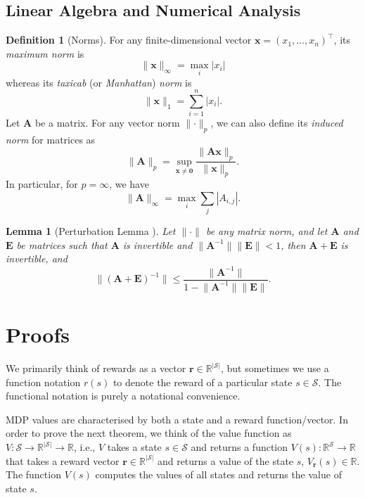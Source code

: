 \documentclass{article}
\newtheorem{lemma}[theorem]{Lemma}
\theoremstyle{definition}
\newtheorem{definition}[theorem]{Definition}
\theoremstyle{remark}
\newcommand{\V}{V_{\mathbf{r}}}
\begin{document}
\subsection{Linear Algebra and Numerical Analysis}

\begin{definition}[Norms]
  For any finite-dimensional vector $\mathbf{x} = (x_1, \dots, x_n)^\intercal$,
  its \emph{maximum norm} is
  \[
    \lVert \mathbf{x} \rVert_\infty = \max_i |x_i|
  \]
  whereas its \emph{taxicab} (or \emph{Manhattan}) \emph{norm} is
  \[
    \lVert \mathbf{x} \rVert_1 = \sum_{i = 1}^n |x_i|.
  \]
  Let $\mathbf{A}$ be a matrix. For any vector norm $\lVert
  \cdot \rVert_p$, we can also define its \emph{induced norm} for matrices as
  \[
    \lVert \mathbf{A} \rVert_p = \sup_{\mathbf{x} \ne \mathbf{0}} \frac{\lVert
      \mathbf{Ax} \rVert_p}{\lVert \mathbf{x} \rVert_p}.
  \]
  In particular, for $p = \infty$, we have
  \[
    \lVert \mathbf{A} \rVert_\infty = \max_i \sum_{j} |A_{i,j}|.
  \]
\end{definition}

\begin{lemma}[Perturbation Lemma
  \cite{layton2014numerical}] \label{prop:condition_number}
  Let $\lVert \cdot \rVert$ be any matrix norm, and let $\mathbf{A}$ and
  $\mathbf{E}$ be matrices such that $\mathbf{A}$ is invertible and $\lVert
  \mathbf{A}^{-1} \rVert \lVert \mathbf{E} \rVert < 1$, then $\mathbf{A} +
  \mathbf{E}$ is invertible, and
  \[
    \lVert (\mathbf{A} + \mathbf{E})^{-1} \rVert \le \frac{\lVert
      \mathbf{A}^{-1} \rVert}{1 - \lVert \mathbf{A}^{-1} \rVert \lVert
      \mathbf{E} \rVert}.
  \]
\end{lemma}

\section{Proofs}

We primarily think of rewards as a vector $\mathbf{r} \in
\mathbb{R}^{|\mathcal{S}|}$, but sometimes we use a function notation $r(s)$ to
denote the reward of a particular state $s \in \mathcal{S}$. The functional
notation is purely a notational convenience.

MDP values are characterised by both a state and a reward function/vector. In
order to prove the next theorem, we think of the value function as $V :
\mathcal{S} \to \mathbb{R}^{|\mathcal{S}|} \to \mathbb{R}$, i.e., $V$ takes a
state $s \in \mathcal{S}$ and returns a function $V(s) :
\mathbb{R}^{\mathcal{S}} \to \mathbb{R}$ that takes a reward vector $\mathbf{r}
\in \mathbb{R}^{|\mathcal{S}|}$ and returns a value of the state $s$,
$\V(s) \in \mathbb{R}$. The function $V(s)$ computes the values of
all states and returns the value of state $s$.
\end{document}
